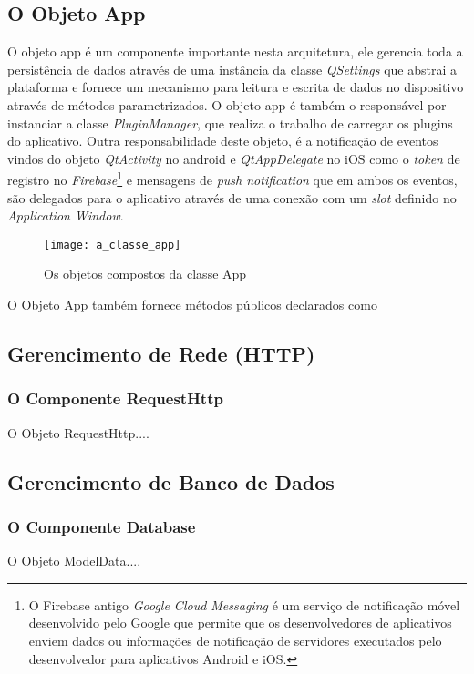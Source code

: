 \subsection{O Objeto App}\label{sec:solucao-desenvolvida}
O objeto app é um componente importante nesta arquitetura, ele gerencia toda a persistência de dados através de uma instância da classe \textit{QSettings} que abstrai a plataforma e fornece um mecanismo para leitura e escrita de dados no dispositivo através de métodos parametrizados. O objeto app é também o responsável por instanciar a classe \textit{PluginManager}, que realiza o trabalho de carregar os plugins do aplicativo. Outra responsabilidade deste objeto, é a notificação de eventos vindos do objeto \textit{QtActivity} no android e \textit{QtAppDelegate} no iOS como o \textit{token} de registro no \textit{Firebase}\footnote{O Firebase antigo \textit{Google Cloud Messaging} é um serviço de notificação móvel desenvolvido pelo Google que permite que os desenvolvedores de aplicativos enviem dados ou informações de notificação de servidores executados pelo desenvolvedor para aplicativos Android e iOS.} e mensagens de \textit{push notification} que em ambos os eventos, são delegados para o aplicativo através de uma conexão com um \textit{slot} definido no \textit{Application Window}.

\begin{figure}[h]
	\texttt{[image: a\_classe\_app]}
	\centering
	\caption{Os objetos compostos da classe App}
\end{figure}

O Objeto App também fornece métodos públicos declarados como 


\subsection{Gerencimento de Rede (HTTP)}\label{sec:solucao-desenvolvida}
\subsubsection{O Componente RequestHttp}\label{sec:solucao-desenvolvida}
O Objeto RequestHttp....


\subsection{Gerencimento de Banco de Dados}\label{sec:solucao-desenvolvida}
\subsubsection{O Componente Database}\label{sec:solucao-desenvolvida}
O Objeto ModelData....


